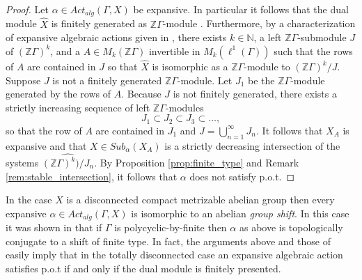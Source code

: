 \documentclass[oneside,english]{amsart}
\newtheorem{prop}[thm]{Proposition}
\theoremstyle{definition}
\newcommand{\ZZ}{\mathbb{Z}}
\newcommand{\Alg}[2]{\mathit{Act}_{\mathit{alg}}({#1},{#2})}
\newcommand{\subG}[2]{\mathit{Sub}_{{#1}}({#2})}
\begin{document}
\begin{proof}
Let $\alpha \in \Alg{\Gamma}{X}$  be expansive. %
In particular it  follows that the dual module $\widehat{X}$ is finitely generated as $\mathbb{Z}\Gamma$-module \cite{MR1036904}.
Furthermore, by a characterization of expansive algebraic actions given in \cite{MR3314515}, there exists $k \in \mathbb{N}$, a left $\mathbb{Z}\Gamma$-submodule $J$ of $(\mathbb{Z}\Gamma)^k$, and a $A \in M_k(\ZZ\Gamma)$  invertible in $M_k(\ell^1(\Gamma))$ such that the rows of $A$ are contained in $J$
so that $\widehat{X}$ is isomorphic as a $\ZZ\Gamma$-module to $(\mathbb{Z}\Gamma)^k / J$.
Suppose $J$ is not a finitely generated $\ZZ\Gamma$-module. Let $J_1$ be the $\ZZ\Gamma$-module generated by the rows of $A$. Because $J$ is not finitely generated, there exists a strictly increasing sequence of left $\mathbb{Z}\Gamma$-modules
$$J_1 \subset J_2 \subset J_3 \subset \ldots,$$
so that the row of $A$ are contained in $J_1$ and $J = \bigcup_{n=1}^\infty J_n$. It follows that $X_A$ is expansive and that $X \in  \subG{\alpha}{X_A}$ is a strictly decreasing intersection of the systems $\widehat{(\mathbb{Z}\Gamma)^k)/J_n}$. By Proposition \ref{prop:finite_type} and Remark \ref{rem:stable_intersection}, it follows that $\alpha$ does not  satisfy p.o.t.
\end{proof}

In the case $X$ is a  disconnected compact metrizable abelian group then every expansive $\alpha \in \Alg{\Gamma}{X}$ is isomorphic to an abelian \emph{group shift}.
In this case it was shown in \cite{MR1345152} that if $\Gamma$ is polycyclic-by-finite then  $\alpha$ as above is topologically conjugate to a shift of finite type.
In fact, the arguments above and those of  \cite{MR1345152} easily imply that in the totally disconnected case an expansive algebraic action satisfies p.o.t if and only if the dual module is finitely presented.

\end{document}
